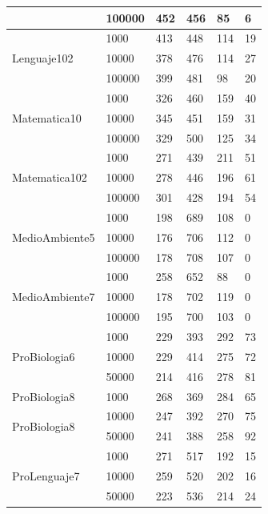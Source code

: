 \begin{longtable}{|p{3cm}|p{3cm}|p{2cm}|p{2cm}|p{2cm}|p{2cm}|}
\cline{2-6}      & 100000 & 452   & 456   & 85    & 6 \\
\hline
\multirow{3}[6]{*}{Lenguaje102} & 1000  & 413   & 448   & 114   & 19 \\
\cline{2-6}      & 10000 & 378   & 476   & 114   & 27 \\
\cline{2-6}      & 100000 & 399   & 481   & 98    & 20 \\
\hline
\multirow{3}[6]{*}{Matematica10} & 1000  & 326   & 460   & 159   & 40 \\
\cline{2-6}      & 10000 & 345   & 451   & 159   & 31 \\
\cline{2-6}      & 100000 & 329   & 500   & 125   & 34 \\
\hline
\multirow{3}[6]{*}{Matematica102} & 1000  & 271   & 439   & 211   & 51 \\
\cline{2-6}      & 10000 & 278   & 446   & 196   & 61 \\
\cline{2-6}      & 100000 & 301   & 428   & 194   & 54 \\
\hline
\multirow{3}[6]{*}{MedioAmbiente5} & 1000  & 198   & 689   & 108   & 0 \\
\cline{2-6}      & 10000 & 176   & 706   & 112   & 0 \\
\cline{2-6}      & 100000 & 178   & 708   & 107   & 0 \\
\hline
\multirow{3}[6]{*}{MedioAmbiente7} & 1000  & 258   & 652   & 88    & 0 \\
\cline{2-6}      & 10000 & 178   & 702   & 119   & 0 \\
\cline{2-6}      & 100000 & 195   & 700   & 103   & 0 \\
\hline
\multirow{3}[6]{*}{ProBiologia6} & 1000  & 229   & 393   & 292   & 73 \\
\cline{2-6}      & 10000 & 229   & 414   & 275   & 72 \\
\cline{2-6}      & 50000 & 214   & 416   & 278   & 81 \\
\hline
ProBiologia8 & 1000  & 268   & 369   & 284   & 65 \\
\multirow{2}[6]{*}{ProBiologia8} & 10000 & 247   & 392   & 270   & 75 \\
\cline{2-6}      & 50000 & 241   & 388   & 258   & 92 \\
\hline
\multirow{3}[6]{*}{ProLenguaje7} & 1000  & 271   & 517   & 192   & 15 \\
\cline{2-6}      & 10000 & 259   & 520   & 202   & 16 \\
\cline{2-6}      & 50000 & 223   & 536   & 214   & 24 \\

\end{longtable}
